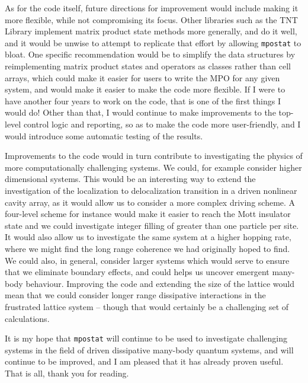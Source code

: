 As for the code itself, future directions for improvement would include making it more flexible, while not compromising its focus. Other libraries such as the TNT Library \cite{TNTlib,Al-Assam2017} implement matrix product state methods more generally, and do it well, and it would be unwise to attempt to replicate that effort by allowing \lstinline$mpostat$ to bloat. One specific recommendation would be to simplify the data structures by reimplementing matrix product states and operators as classes rather than cell arrays, which could make it easier for users to write the MPO for any given system, and would make it easier to make the code more flexible. If I were to have another four years to work on the code, that is one of the first things I would do! Other than that, I would continue to make improvements to the top-level control logic and reporting, so as to make the code more user-friendly, and I would introduce some automatic testing of the results. 

Improvements to the code would in turn contribute to investigating the physics of more computationally challenging systems. We could, for example consider higher dimensional systems. This would be an interesting way to extend the investigation of the localization to delocalization transition in a driven nonlinear cavity array, as it would allow us to consider a more complex driving scheme. A four-level scheme for instance would make it easier to reach the Mott insulator state and we could investigate integer filling of greater than one particle per site. It would also allow us to investigate the same system at a higher hopping rate, where we might find the long range coherence we had originally hoped to find. We could also, in general, consider larger systems which would serve to ensure that we eliminate boundary effects, and could helps us uncover emergent many-body behaviour. Improving the code and extending the size of the lattice would mean that we could consider longer range dissipative interactions in the frustrated lattice system -- though that would certainly be a challenging set of calculations.

It is my hope that \lstinline$mpostat$ will continue to be used to investigate challenging systems in the field of driven dissipative many-body quantum systems, and will continue to be improved, and I am pleased that it has already proven useful. That is all, thank you for reading.